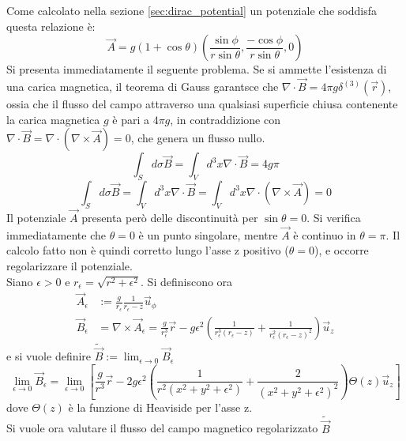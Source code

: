 Come calcolato nella sezione \ref{sec:dirac_potential} un potenziale che soddisfa
questa relazione è:
\begin{equation}\label{eq:diracpotential}
  \vec A = g(1 + \cos\theta)\left( \frac{\sin\phi}{r\sin\theta},
     \frac{-\cos\phi}{r\sin\theta},0 \right)
\end{equation}
Si presenta immediatamente il seguente problema. Se si ammette l'esistenza di una carica
magnetica, il teorema di Gauss garantsce che $\nabla \cdot \vec B = 4\pi g\delta^{(3)}(\vec r)$,
ossia che il flusso del campo attraverso una qualsiasi superficie chiusa contenente
la carica magnetica $g$ è pari a $4\pi g$, in contraddizione con
$\nabla \cdot \vec B = \nabla \cdot (\nabla \times \vec A) = 0$, che genera un
flusso nullo.
\begin{equation}\label{eq:B4gpi}
   \int_S d\sigma \vec B = \int_V d^3 x \nabla \cdot \vec B = 4g\pi
\end{equation}
\begin{equation}
   \int_S d\sigma \vec B = \int_V d^3 x \nabla \cdot \vec B
      = \int_V d^3 x \nabla \cdot (\nabla \times \vec A) = 0
\end{equation}
Il potenziale $\vec A$ presenta però delle discontinuità per $\sin\theta = 0$.
Si verifica immediatamente che $\theta = 0$ è un punto singolare, mentre $\vec A$
è continuo in $\theta = \pi$. Il calcolo fatto non è quindi corretto lungo l'asse z
positivo ($\theta = 0$), e occorre regolarizzare il potenziale.\\
Siano $\epsilon > 0$  e $r_\epsilon = \sqrt{r^2 + \epsilon^2}$. Si definiscono ora
%
\begin{align*}
   \vec A_\epsilon &:= \frac{g}{r_\epsilon}\frac{1}{r_\epsilon - z} \vec u _\phi  \\
   \vec B _\epsilon & = \nabla \times \vec A_\epsilon = \frac{g}{r_\epsilon^3}\vec r
      - g\epsilon^2 \left( \frac{1}{r_\epsilon^3(r_\epsilon - z)}
         + \frac{1}{r_\epsilon^2(r_\epsilon-z)^2} \right)\vec u _z
\end{align*}
%
e si vuole definire $\tilde{\vec B} := \lim_{\epsilon \to 0} \vec B _\epsilon$
$$
   \lim_{\epsilon \to 0} \vec B_\epsilon = \lim_{\epsilon \to 0} \left[
      \frac{g}{r^3}\vec r - 2g\epsilon^2 \left( \frac{1}{r^2(x^2 + y^2 + \epsilon^2)}
            + \frac{2}{(x^2 + y^2 + \epsilon^2)^2} \right) \Theta(z) \vec u _z \right]
$$
dove $\Theta(z)$ è la funzione di Heaviside per l'asse z.\\
Si vuole ora valutare il flusso del campo magnetico regolarizzato $\tilde{\vec B}$
